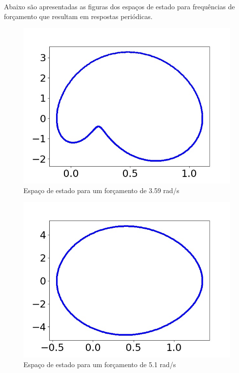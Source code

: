 

Abaixo são apresentadas as figuras dos espaços de estado para frequências de forçamento que resultam em respostas periódicas.

\begin{figure}[!ht]
	\centering
	\includegraphics[scale=0.365]{state_space/figura1.jpg}
	\caption{Espaço de estado para um forçamento de 3.59 rad/s}
	\label{state_space_3.59rad/s}
\end{figure}

\begin{figure}[!ht]
	\centering
	\includegraphics[scale=0.365]{state_space/figura2.jpg}
	\caption{Espaço de estado para um forçamento de 5.1 rad/s}
	\label{state_space_5.1rad/s}
\end{figure}

